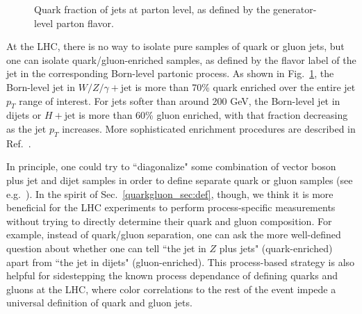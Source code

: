 \documentclass[11pt]{cernrep}
\begin{document}
\begin{figure}
\centering
{}
\caption{Quark fraction of jets at parton level, as defined by the generator-level parton flavor.}
\label{quarkgluon_fig:parton_level_qg_composition}
\end{figure}

At the LHC, there is no way to isolate pure samples of quark or gluon jets, but one can isolate quark/gluon-enriched samples, as defined by the flavor label of the jet in the corresponding Born-level partonic process.  As shown in Fig.~\ref{quarkgluon_fig:parton_level_qg_composition}, the Born-level jet in $W/Z/\gamma + \text{jet}$ is more than 70\% quark enriched over the entire jet $p_T$ range of interest.  For jets softer than around 200 GeV, the Born-level jet in dijets or $H+\text{jet}$ is more than 60\% gluon enriched, with that fraction decreasing as the jet $p_T$ increases.  More sophisticated enrichment procedures are described in Ref.~\cite{Gallicchio:2011xc}.

In principle, one could try to ``diagonalize" some combination of vector boson plus jet and dijet samples in order to define separate quark or gluon samples (see e.g.~\cite{Aad:2014gea}).  In the spirit of Sec.~\ref{quarkgluon_sec:def}, though, we think it is more beneficial for the LHC experiments to perform process-specific measurements without trying to directly determine their quark and gluon composition.  For example, instead of quark/gluon separation, one can ask the more well-defined question about whether one can tell ``the jet in $Z$ plus jets" (quark-enriched) apart from ``the jet in dijets" (gluon-enriched).  This process-based strategy is also helpful for sidestepping the known process dependance of defining quarks and gluons at the LHC, where color correlations to the rest of the event impede a universal definition of quark and gluon jets.
\end{document}
